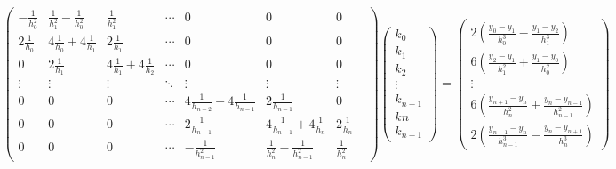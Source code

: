 \documentclass[11pt]{article}
\begin{document}
\begin{align}
\begin{pmatrix}
	-\frac{1}{h_0^2} & \frac{1}{h_1^2}-\frac{1}{h_0^2} & \frac{1}{h_1^2} & \cdots &0 &0 &0\\
	2\frac{1}{h_0} & 4\frac{1}{h_0}+4\frac{1}{h_1} & 2\frac{1}{h_1} & \cdots &0 &0 &0\\
	0 & 2\frac{1}{h_1} & 4\frac{1}{h_1}+4\frac{1}{h_2}& \cdots &0 &0 &0\\
	\vdots & \vdots &\vdots &\ddots &\vdots & \vdots &\vdots\\
		0 &0 &0 &\cdots & 4\frac{1}{h_{n-2}}+4\frac{1}{h_{n-1}} & 2\frac{1}{h_{n-1}} &0\\
	0 &0 &0 &\cdots & 2\frac{1}{h_{n-1}} & 4\frac{1}{h_{n-1}}+4\frac{1}{h_n} & 2\frac{1}{h_n}\\
	0 &0 &0 &\cdots & -\frac{1}{h_{n-1}^2} & \frac{1}{h_n^2}-\frac{1}{h_{n-1}^2} & \frac{1}{h_n^2} &
\end{pmatrix}
\begin{pmatrix}
	k_0\\k_1\\k_2\\\vdots\\k_{n-1}\\k{n}\\k_{n+1}
\end{pmatrix}
=\begin{pmatrix}
	2(\frac{y_0-y_1}{h_0^3}-\frac{y_1-y_2}{h_1^3})\\
	6(\frac{y_2-y_1}{h_1^2}+\frac{y_1-y_0}{h_0^2})
	\\\vdots\\
	6(\frac{y_{n+1}-y_n}{h_n^2}+\frac{y_n-y_{n-1}}{h_{n-1}^2})\\
	2(\frac{y_{n-1}-y_n}{h_{n-1}^3}-\frac{y_n-y_{n+1}}{h_n^3})
\end{pmatrix}
\end{align}
\end{document}
